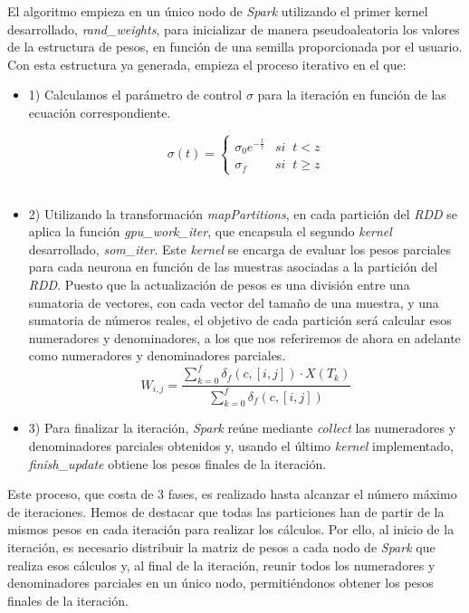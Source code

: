 El algoritmo empieza en un único nodo de \textit{Spark} utilizando el primer kernel desarrollado, \textit{rand\_weights}, para inicializar de manera pseudoaleatoria los valores de la estructura de pesos, en función de una semilla proporcionada por el usuario. Con esta estructura ya generada, empieza el proceso iterativo en el que:
\begin{itemize}
    \item 1) Calculamos el parámetro de control $\sigma$ para la iteración en función de las ecuación correspondiente.

$$\sigma(t) = \left\{
\begin{array}{ll}
\sigma_0e^{-\frac{t}{\tau}} & si \;\;t < z\\
\sigma_f & si  \;\; t\geq z
\end{array}
\right.
$$\\
    \item 2) Utilizando la transformación \textit{mapPartitions}, en cada partición del \textit{RDD} se aplica la función \textit{gpu\_work\_iter}, que encapsula el segundo  \textit{kernel} desarrollado, \textit{som\_iter}. Este \textit{kernel} se encarga de evaluar los pesos parciales para cada neurona en función de las muestras asociadas a la partición del \textit{RDD}. Puesto que la actualización de pesos es una división entre una sumatoria de vectores, con cada vector del tamaño de una muestra, y una sumatoria de números reales, el objetivo de cada partición será calcular esos numeradores y denominadores, a los que nos referiremos de ahora en adelante como numeradores y denominadores parciales.
    $$
 W_{i, j} = \frac{\sum_{k=0}^{f} \delta_f(c, [i,j]) \cdot  X(T_k) }{\sum_{k=0}^{f} \delta_f(c, [i,j])}
$$
    \item 3) Para finalizar la iteración, \textit{Spark} reúne mediante \textit{collect} las numeradores y denominadores parciales obtenidos y, usando el último \textit{kernel} implementado, \textit{finish\_update} obtiene los pesos finales de la iteración.\\
\end{itemize}

Este proceso, que costa de 3 fases, es realizado hasta alcanzar el número máximo de iteraciones. Hemos de destacar que todas las particiones han de partir de la mismos pesos en cada iteración para realizar los cálculos. Por ello, al inicio de la iteración, es necesario distribuir la matriz de pesos a cada nodo de \textit{Spark} que realiza esos cálculos y, al final de la iteración, reunir todos los numeradores y denominadores parciales en un único nodo, permitiéndonos obtener los pesos finales de la iteración. \\

